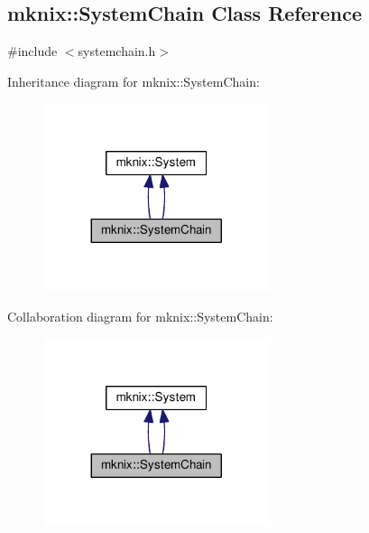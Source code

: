 \hypertarget{classmknix_1_1_system_chain}{}\subsection{mknix\+:\+:System\+Chain Class Reference}
\label{classmknix_1_1_system_chain}


{\ttfamily \#include $<$systemchain.\+h$>$}



Inheritance diagram for mknix\+:\+:System\+Chain\+:\nopagebreak
\begin{figure}[H]
\begin{center}
\leavevmode
\includegraphics[width=188pt]{dd/df2/classmknix_1_1_system_chain__inherit__graph}
\end{center}
\end{figure}


Collaboration diagram for mknix\+:\+:System\+Chain\+:\nopagebreak
\begin{figure}[H]
\begin{center}
\leavevmode
\includegraphics[width=188pt]{d5/d10/classmknix_1_1_system_chain__coll__graph}
\end{center}
\end{figure}
